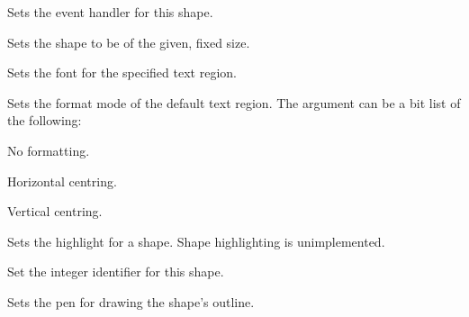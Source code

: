 

Sets the event handler for this shape.



Sets the shape to be of the given, fixed size.



Sets the font for the specified text region.

\label{setformatmode}


Sets the format mode of the default text region. The argument can be a bit list
of the following:

\begin{description}\itemsep=0pt
\item[FORMAT\_NONE] No formatting.
\item[FORMAT\_CENTRE\_HORIZ] Horizontal centring.
\item[FORMAT\_CENTRE\_VERT] Vertical centring.
\end{description}



Sets the highlight for a shape. Shape highlighting is unimplemented.



Set the integer identifier for this shape.



Sets the pen for drawing the shape's outline.

\label{wxshapesetregionname}


